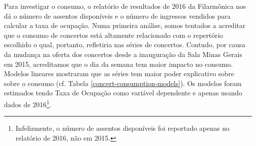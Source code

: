 \documentclass[a4paper, 12pt, openright, oneside, german, french, english, brazil]{abntex2}
\begin{document}
	Para investigar o consumo, o relatório de resultados de 2016 da Filarmônica nos dá o número de assentos disponíveis e o número de ingressos vendidos para calcular a taxa de ocupação. Numa primeira análise, somos tentados a acreditar que o consumo de concertos está altamente relacionado com o repertório escolhido o qual, portanto, refletiria nas séries de concertos. Contudo, por causa da mudança na oferta dos concertos desde a inauguração da Sala Minas Gerais em 2015, acreditamos que o dia da semana tem maior impacto no consumo. Modelos lineares mostraram que as séries tem maior poder explicativo sobre sobre o consumo (cf. Tabela \ref{concert-consumption-models}). Os modelos foram estimados tendo Taxa de Ocupação como variável dependente e apenas usando dados de 2016\footnote{Infelizmente, o número de assentos disponíveis foi reportado apenas no relatório de 2016, não em 2015.}.
\end{document}
